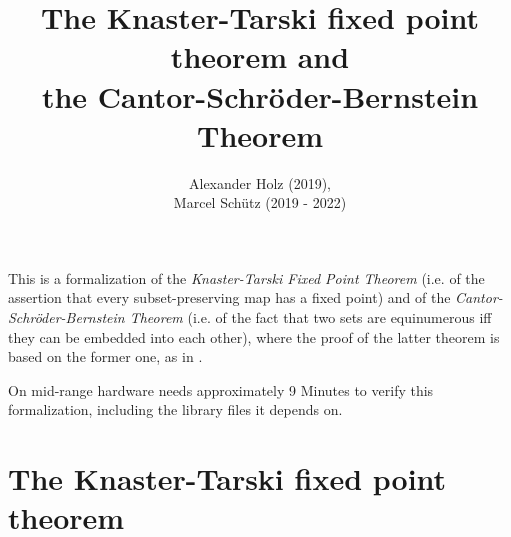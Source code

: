 \documentclass{article}
\title{The Knaster-Tarski fixed point theorem and \\
the Cantor-Schröder-Bernstein Theorem}
\author{Alexander Holz (2019), \\
Marcel Schütz (2019 - 2022)}
\date{}
\begin{document}
  \maketitle

  \noindent This is a formalization of the \textit{Knaster-Tarski Fixed Point
  Theorem} (i.e. of the assertion that every subset-preserving map has a fixed
  point) and of the \textit{Cantor-Schröder-Bernstein Theorem} (i.e. of the
  fact that two sets are equinumerous iff they can be embedded into each other),
  where the proof of the latter theorem is based on the former one, as in
  \cite[p. 530]{Schroeder2012}.

  On mid-range hardware \Naproche needs approximately 9 Minutes to verify this
  formalization, including the library files it depends on.

  \begin{forthel}
  \end{forthel}


  \section*{The Knaster-Tarski fixed point theorem}
\end{document}
